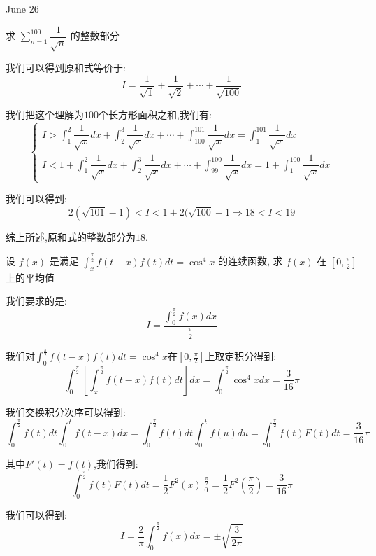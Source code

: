 \textcolor{purplea}{June 26}

\begin{example}[][Exam: 32.4.9]
	求 $\sum\limits_{n=1}^{100}\dfrac{1}{\sqrt{n}}$ 的整数部分
\end{example}

\begin{solution}
	
	我们可以得到原和式等价于: 
	$$I=\dfrac{1}{\sqrt{1}}+\dfrac{1}{\sqrt{2}}+\cdots+\dfrac{1}{\sqrt{100}}$$
	
	我们把这个理解为$100$个长方形面积之和,我们有: 
	$$\left\lbrace
	\begin{array}{l}
		I>\int_{1}^{2}\dfrac{1}{\sqrt{x}}dx+\int_{2}^{3}\dfrac{1}{\sqrt{x}}dx+\cdots+\int_{100}^{101}\dfrac{1}{\sqrt{x}}dx=\int_{1}^{101}\dfrac{1}{\sqrt{x}}dx\\
		I<1+\int_{1}^{2}\dfrac{1}{\sqrt{x}}dx+\int_{2}^{3}\dfrac{1}{\sqrt{x}}dx+\cdots+\int_{99}^{100}\dfrac{1}{\sqrt{x}}dx=1+\int_{1}^{100}\dfrac{1}{\sqrt{x}}dx
	\end{array}
	\right. $$
	
	我们可以得到: 
	$$2(\sqrt{101}-1)<I<1+2(\sqrt{100}-1\Rightarrow 18<I<19$$
	
	综上所述,原和式的整数部分为$18$.
\end{solution}

\begin{example}[][Exam: 32.4.10]
	设 $f(x)$ 是满足 $\int_{x}^{\frac{\pi}{2}}f(t-x)f(t)dt=\cos^4 x$ 的连续函数, 求 $f(x)$ 在 $[0,\frac{\pi}{2}]$ 上的平均值
\end{example}
\begin{solution}
	
	我们要求的是: $$I=\dfrac{\int_{0}^{\frac{\pi}{2}}f(x)dx}{\frac{\pi}{2}}$$
	
	我们对$\int_{0}^{\frac{\pi}{2}}f(t-x)f(t)dt=\cos^4 x$在$[0,\frac{\pi}{2}]$上取定积分得到: 
	$$\int_{0}^{\frac{\pi}{2}}\left[ \int_{x}^{\frac{\pi}{2}}f(t-x)f(t)dt\right] dx=\int_{0}^{\frac{\pi}{2}}\cos^4 xdx=\dfrac{3}{16}\pi$$
	
	我们交换积分次序可以得到: 
	$$\int_{0}^{\frac{\pi}{2}}f(t)dt\int_{0}^{t}f(t-x)dx=\int_{0}^{\frac{\pi}{2}}f(t)dt\int_{0}^{t}f(u)du=\int_{0}^{\frac{\pi}{2}}f(t)F(t)dt=\dfrac{3}{16}\pi$$
	
	其中$F'(t)=f(t)$,我们得到: 
	$$\int_{0}^{\frac{\pi}{2}}f(t)F(t)dt=\dfrac{1}{2}F^{2}(x)|_{0}^{\frac{\pi}{2}}=\dfrac{1}{2}F^2(\frac{\pi}{2})=\dfrac{3}{16}\pi$$
	
	我们可以得到: 
	$$I=\dfrac{2}{\pi}\int_{0}^{\frac{\pi}{2}}f(x)dx=\pm\sqrt{\dfrac{3}{2\pi}}$$
\end{solution}


